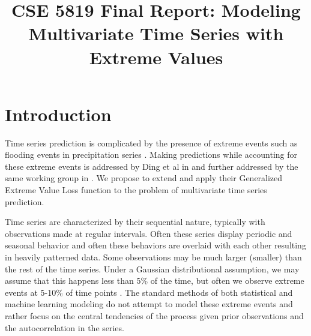\documentclass[conference]{IEEEtran}
\begin{document}
\title{CSE 5819 Final Report: Modeling Multivariate Time Series with Extreme Values
}

\author{
\and
{}
}

\maketitle
\thispagestyle{plain}
\pagestyle{plain}

\section{Introduction}

Time series prediction is complicated by the presence of extreme events such as flooding events in precipitation series \cite{zhangEnhancingTimeSeries2021}. Making predictions while accounting for these extreme events is addressed by Ding et al in \cite{dingModelingExtremeEvents2019} and further addressed by the same working group in \cite{zhangEnhancingTimeSeries2021}. We propose to extend and apply their Generalized Extreme Value Loss function to the problem of multivariate time series prediction. 

Time series are characterized by their sequential nature, typically with observations made at regular intervals. Often these series display periodic and seasonal behavior and often these behaviors are overlaid with each other resulting in heavily patterned data. Some observations may be much larger (smaller) than the rest of the time series. Under a Gaussian distributional assumption, we may assume that this happens less than 5\% of the time, but often we observe extreme events at 5-10\% of time points \cite{dingModelingExtremeEvents2019}. The standard methods of both statistical and machine learning modeling do not attempt to model these extreme events and rather focus on the central tendencies of the process given prior observations and the autocorrelation in the series.
\end{document}

